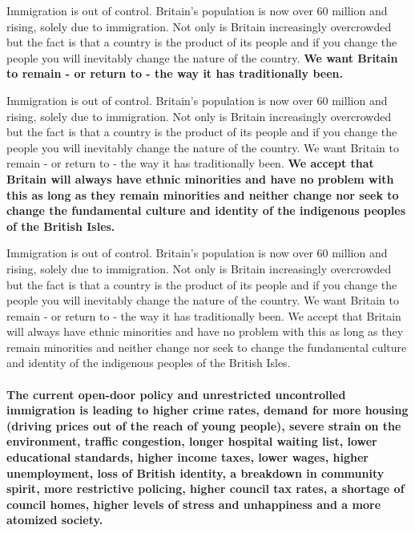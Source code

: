 \documentclass[kp]{foilpack}
\begin{document}
\newpage

\footnotesize
Immigration is out of control.
Britain's population is now over 60 million and rising, solely due to immigration.
Not only is Britain increasingly overcrowded but the fact is that a country is the product of its people  and
if you change the people you will inevitably change the nature of the country.
\textbf{We want Britain to remain - or return to - the way it has traditionally been.}
\normalsize

\newpage

\footnotesize
Immigration is out of control.
Britain's population is now over 60 million and rising, solely due to immigration.
Not only is Britain increasingly overcrowded but the fact is that a country is the product of its people  and
if you change the people you will inevitably change the nature of the country.
We want Britain to remain - or return to - the way it has traditionally been.
\textbf{We accept that Britain will always have ethnic minorities and 
have no problem with this as long as they remain minorities and
neither change nor seek to change the fundamental culture and identity of the indigenous peoples of the British Isles.}
\normalsize

\newpage

\footnotesize
Immigration is out of control.
Britain's population is now over 60 million and rising, solely due to immigration.
Not only is Britain increasingly overcrowded but the fact is that a country is the product of its people  and
if you change the people you will inevitably change the nature of the country.
We want Britain to remain - or return to - the way it has traditionally been.
We accept that Britain will always have ethnic minorities and 
have no problem with this as long as they remain minorities and
neither change nor seek to change the fundamental culture and identity of the indigenous peoples of the British Isles.\\
~\\
\textbf{The current open-door policy and unrestricted uncontrolled immigration is leading to higher crime rates, demand for more housing (driving prices out of the reach of young people), severe strain on the environment, traffic congestion, longer hospital waiting list, lower educational standards, higher income taxes, lower wages, higher unemployment, loss of British identity, a breakdown in community spirit, more restrictive policing, higher council tax rates, a shortage of council homes, higher levels of stress and unhappiness and a more atomized society.}
\normalsize
\end{document}
